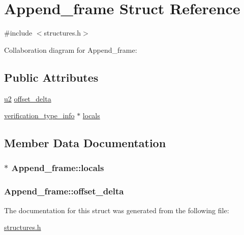 \hypertarget{structAppend__frame}{}\section{Append\+\_\+frame Struct Reference}
\label{structAppend__frame}


{\ttfamily \#include $<$structures.\+h$>$}



Collaboration diagram for Append\+\_\+frame\+:
\subsection*{Public Attributes}
\begin{DoxyCompactItemize}
\item 
\hyperlink{structures_8h_a55ef8d87fd202b8417704c089899c5b9}{u2} \hyperlink{structAppend__frame_a8a6963561a77d764146805d9d99bd61a}{offset\+\_\+delta}
\item 
\hyperlink{structverification__type__info}{verification\+\_\+type\+\_\+info} $\ast$ \hyperlink{structAppend__frame_ad05887fedeaec3902dd866e10aa7d192}{locals}
\end{DoxyCompactItemize}


\subsection{Member Data Documentation}
\subsubsection[{\texorpdfstring{locals}{locals}}]{$\ast$ Append\+\_\+frame\+::locals}\hypertarget{structAppend__frame_ad05887fedeaec3902dd866e10aa7d192}{}\label{structAppend__frame_ad05887fedeaec3902dd866e10aa7d192}
\subsubsection[{\texorpdfstring{offset\+\_\+delta}{offset_delta}}]{ Append\+\_\+frame\+::offset\+\_\+delta}\hypertarget{structAppend__frame_a8a6963561a77d764146805d9d99bd61a}{}\label{structAppend__frame_a8a6963561a77d764146805d9d99bd61a}


The documentation for this struct was generated from the following file\+:\begin{DoxyCompactItemize}
\item 
\hyperlink{structures_8h}{structures.\+h}\end{DoxyCompactItemize}
